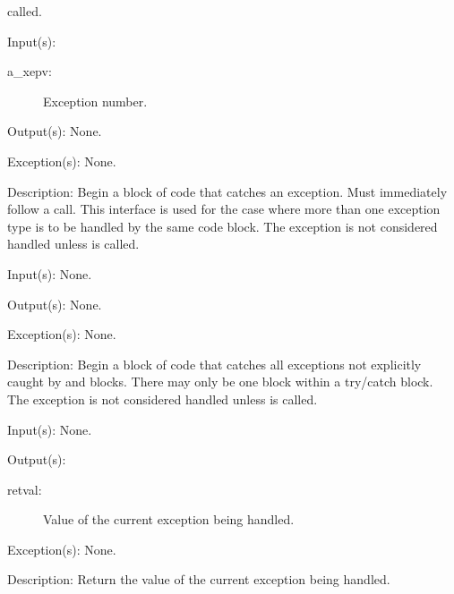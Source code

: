 \begin{capi}
\begin{capilist}
		called.
	\end{capilist}
\label{xep_mcatch}
	\begin{capilist}
	\item[Input(s): ]
		\begin{description}\item[]
		\item[a\_xepv: ]
			Exception number.
		\end{description}
	\item[Output(s): ] None.
	\item[Exception(s): ] None.
	\item[Description: ]
		Begin a block of code that catches an exception.  Must
		immediately follow a  call.  This interface
		is used for the case where more than one exception type is to be
		handled by the same code block.  The exception is not considered
		handled unless  is called.
	\end{capilist}
\label{xep_acatch}
	\begin{capilist}
	\item[Input(s): ] None.
	\item[Output(s): ] None.
	\item[Exception(s): ] None.
	\item[Description: ]
		Begin a block of code that catches all exceptions not explicitly
		caught by  and \cppmacro{xep\_mcatch}{}
		blocks.  There may only be one  block within
		a try/catch block.  The exception is not considered handled
		unless  is called.
	\end{capilist}
\label{xep_value}
	\begin{capilist}
	\item[Input(s): ] None.
	\item[Output(s): ]
		\begin{description}\item[]
		\item[retval: ]
			Value of the current exception being handled.
		\end{description}
	\item[Exception(s): ] None.
	\item[Description: ]
		Return the value of the current exception being handled.

\end{capilist}
\end{capi}
